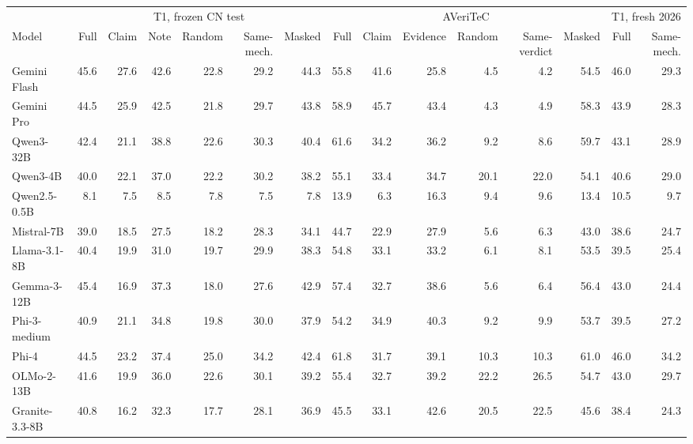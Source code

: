 \begin{tabular}{@{}lrrrrrr@{\hspace{8pt}}rrrrrr@{\hspace{8pt}}rr@{}}
\toprule
 & \multicolumn{6}{c}{T1, frozen CN test} & \multicolumn{6}{c}{AVeriTeC} & \multicolumn{2}{c}{T1, fresh 2026} \\
\cmidrule(lr){2-7}\cmidrule(lr){8-13}\cmidrule(l){14-15}
Model & Full & Claim & Note & Random & Same-mech. & Masked & Full & Claim & Evidence & Random & Same-verdict & Masked & Full & Same-mech. \\
\midrule
Gemini Flash & 45.6 & 27.6 & 42.6 & 22.8 & 29.2 & 44.3 & 55.8 & 41.6 & 25.8 & 4.5 & 4.2 & 54.5 & 46.0 & 29.3 \\
Gemini Pro & 44.5 & 25.9 & 42.5 & 21.8 & 29.7 & 43.8 & 58.9 & 45.7 & 43.4 & 4.3 & 4.9 & 58.3 & 43.9 & 28.3 \\
Qwen3-32B & 42.4 & 21.1 & 38.8 & 22.6 & 30.3 & 40.4 & 61.6 & 34.2 & 36.2 & 9.2 & 8.6 & 59.7 & 43.1 & 28.9 \\
Qwen3-4B & 40.0 & 22.1 & 37.0 & 22.2 & 30.2 & 38.2 & 55.1 & 33.4 & 34.7 & 20.1 & 22.0 & 54.1 & 40.6 & 29.0 \\
Qwen2.5-0.5B & 8.1 & 7.5 & 8.5 & 7.8 & 7.5 & 7.8 & 13.9 & 6.3 & 16.3 & 9.4 & 9.6 & 13.4 & 10.5 & 9.7 \\
Mistral-7B & 39.0 & 18.5 & 27.5 & 18.2 & 28.3 & 34.1 & 44.7 & 22.9 & 27.9 & 5.6 & 6.3 & 43.0 & 38.6 & 24.7 \\
Llama-3.1-8B & 40.4 & 19.9 & 31.0 & 19.7 & 29.9 & 38.3 & 54.8 & 33.1 & 33.2 & 6.1 & 8.1 & 53.5 & 39.5 & 25.4 \\
Gemma-3-12B & 45.4 & 16.9 & 37.3 & 18.0 & 27.6 & 42.9 & 57.4 & 32.7 & 38.6 & 5.6 & 6.4 & 56.4 & 43.0 & 24.4 \\
Phi-3-medium & 40.9 & 21.1 & 34.8 & 19.8 & 30.0 & 37.9 & 54.2 & 34.9 & 40.3 & 9.2 & 9.9 & 53.7 & 39.5 & 27.2 \\
Phi-4 & 44.5 & 23.2 & 37.4 & 25.0 & 34.2 & 42.4 & 61.8 & 31.7 & 39.1 & 10.3 & 10.3 & 61.0 & 46.0 & 34.2 \\
OLMo-2-13B & 41.6 & 19.9 & 36.0 & 22.6 & 30.1 & 39.2 & 55.4 & 32.7 & 39.2 & 22.2 & 26.5 & 54.7 & 43.0 & 29.7 \\
Granite-3.3-8B & 40.8 & 16.2 & 32.3 & 17.7 & 28.1 & 36.9 & 45.5 & 33.1 & 42.6 & 20.5 & 22.5 & 45.6 & 38.4 & 24.3 \\
\bottomrule
\end{tabular}
